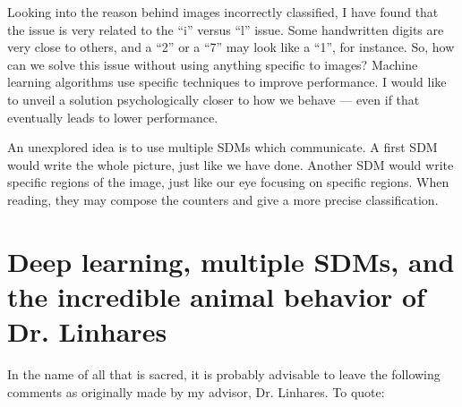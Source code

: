 Looking into the reason behind images incorrectly classified, I have found that the issue is very related to the ``i'' versus ``l'' issue. Some handwritten digits are very close to others, and a ``2'' or a ``7'' may look like a ``1'', for instance. So, how can we solve this issue without using anything specific to images?  Machine learning algorithms use specific techniques to improve performance. I would like to unveil a solution psychologically closer to how we behave --- even if that eventually leads to lower performance.

An unexplored idea is to use multiple SDMs which communicate. A first SDM would write the whole picture, just like we have done. Another SDM would write specific regions of the image, just like our eye focusing on specific regions. When reading, they may compose the counters and give a more precise classification.



\section{Deep learning, multiple SDMs, and the incredible animal behavior of Dr. Linhares}

In the name of all that is sacred, it is probably advisable to leave the following comments as originally made by my advisor, Dr. Linhares. To quote:


